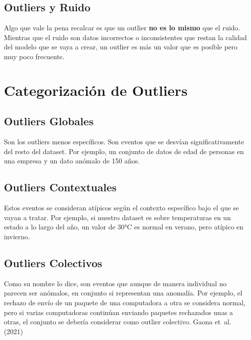 \documentclass[
  spanish,
  letterpaper,
  DIV=11,
  numbers=noendperiod]{scrreprt}
\begin{document}
\section{Outliers y Ruido}\label{outliers-y-ruido}

Algo que vale la pena recalcar es que un outlier \textbf{no es lo mismo}
que el ruido. Mientras que el ruido son datos incorrectos o
inconsistentes que restan la calidad del modelo que se vaya a crear, un
outlier es más un valor que es posible pero muy poco frecuente.


\chapter{Categorización de
Outliers}\label{categorizaciuxf3n-de-outliers}

\section{Outliers Globales}\label{outliers-globales}

Son los outliers menos específicos. Son eventos que se desvían
significativamente del resto del dataset. Por ejemplo, un conjunto de
datos de edad de personas en una empresa y un dato anómalo de 150 años.

\section{Outliers Contextuales}\label{outliers-contextuales}

Estos eventos se consideran atípicos según el contexto específico bajo
el que se vayan a tratar. Por ejemplo, si nuestro dataset es sobre
temperaturas en un estado a lo largo del año, un valor de 30°C es normal
en verano, pero atípico en invierno.

\section{Outliers Colectivos}\label{outliers-colectivos}

Como su nombre lo dice, son eventos que aunque de manera individual no
parecen ser anómalos, en conjunto si representan una anomalía. Por
ejemplo, el rechazo de envío de un paquete de una computadora a otra se
considera normal, pero si varias computadoras continúan enviando
paquetes rechazados unas a otras, el conjunto se debería considerar como
outlier colectivo. Gaona et~al. (2021)
\end{document}
